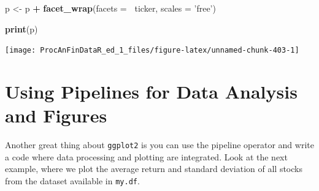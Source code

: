 \documentclass[11pt,]{book}
\newenvironment{Shaded}{\begin{snugshade}}{\end{snugshade}}
\newcommand{\KeywordTok}[1]{\textcolor[rgb]{0.27,0.27,0.27}{\textbf{#1}}}
\newcommand{\DataTypeTok}[1]{\textcolor[rgb]{0.27,0.27,0.27}{#1}}
\newcommand{\StringTok}[1]{\textcolor[rgb]{0.5,0.5,0.5}{#1}}
\newcommand{\CommentTok}[1]{\textcolor[rgb]{0.56,0.35,0.01}{\textit{#1}}}
\newcommand{\OperatorTok}[1]{\textcolor[rgb]{0.81,0.36,0.00}{\textbf{#1}}}
\newcommand{\NormalTok}[1]{#1}
\begin{document}
\begin{Shaded}
\begin{Highlighting}[]
\NormalTok{p <-}\StringTok{ }\NormalTok{p }\OperatorTok{+}\StringTok{ }\KeywordTok{facet_wrap}\NormalTok{(}\DataTypeTok{facets =} \OperatorTok{~}\NormalTok{ticker, }\DataTypeTok{scales =} \StringTok{'free'}\NormalTok{)}
    
\KeywordTok{print}\NormalTok{(p)}
\end{Highlighting}
\end{Shaded}

\begin{center}\texttt{[image: ProcAnFinDataR\_ed\_1\_files/figure-latex/unnamed-chunk-403-1]} \end{center}

\section{Using Pipelines for Data Analysis and
Figures}\label{using-pipelines-for-data-analysis-and-figures}

Another great thing about \texttt{ggplot2} is you can use the pipeline
operator and write a code where data processing and plotting are
integrated. Look at the next example, where we plot the average return
and standard deviation of all stocks from the dataset available in
\texttt{my.df}.

\begin{Shaded}
\end{Shaded}
\end{document}

